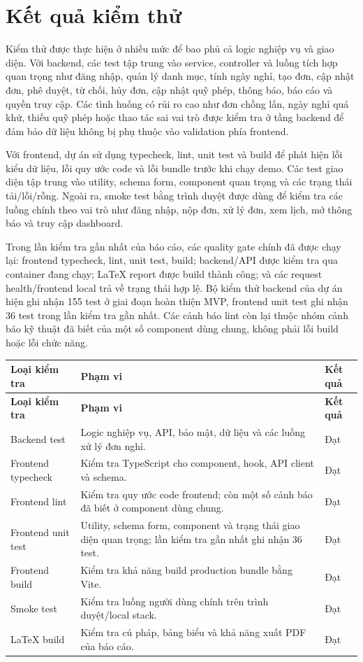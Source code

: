 \section{Kết quả kiểm thử}
Kiểm thử được thực hiện ở nhiều mức để bao phủ cả logic nghiệp vụ và giao diện. Với backend, các test tập trung vào service, controller và luồng tích hợp quan trọng như đăng nhập, quản lý danh mục, tính ngày nghỉ, tạo đơn, cập nhật đơn, phê duyệt, từ chối, hủy đơn, cập nhật quỹ phép, thông báo, báo cáo và quyền truy cập. Các tình huống có rủi ro cao như đơn chồng lấn, ngày nghỉ quá khứ, thiếu quỹ phép hoặc thao tác sai vai trò được kiểm tra ở tầng backend để đảm bảo dữ liệu không bị phụ thuộc vào validation phía frontend.

Với frontend, dự án sử dụng typecheck, lint, unit test và build để phát hiện lỗi kiểu dữ liệu, lỗi quy ước code và lỗi bundle trước khi chạy demo. Các test giao diện tập trung vào utility, schema form, component quan trọng và các trạng thái tải/lỗi/rỗng. Ngoài ra, smoke test bằng trình duyệt được dùng để kiểm tra các luồng chính theo vai trò như đăng nhập, nộp đơn, xử lý đơn, xem lịch, mở thông báo và truy cập dashboard.

Trong lần kiểm tra gần nhất của báo cáo, các quality gate chính đã được chạy lại: frontend typecheck, lint, unit test, build; backend/API được kiểm tra qua container đang chạy; LaTeX report được build thành công; và các request health/frontend local trả về trạng thái hợp lệ. Bộ kiểm thử backend của dự án hiện ghi nhận 155 test ở giai đoạn hoàn thiện MVP, frontend unit test ghi nhận 36 test trong lần kiểm tra gần nhất. Các cảnh báo lint còn lại thuộc nhóm cảnh báo kỹ thuật đã biết của một số component dùng chung, không phải lỗi build hoặc lỗi chức năng.

\begin{longtable}{p{}p{}p{}}
\toprule
\textbf{Loại kiểm tra} & \textbf{Phạm vi} & \textbf{Kết quả} \\
\midrule
\endfirsthead
\toprule
\textbf{Loại kiểm tra} & \textbf{Phạm vi} & \textbf{Kết quả} \\
\midrule
\endhead
Backend test & Logic nghiệp vụ, API, bảo mật, dữ liệu và các luồng xử lý đơn nghỉ. & Đạt \\
Frontend typecheck & Kiểm tra TypeScript cho component, hook, API client và schema. & Đạt \\
Frontend lint & Kiểm tra quy ước code frontend; còn một số cảnh báo đã biết ở component dùng chung. & Đạt \\
Frontend unit test & Utility, schema form, component và trạng thái giao diện quan trọng; lần kiểm tra gần nhất ghi nhận 36 test. & Đạt \\
Frontend build & Kiểm tra khả năng build production bundle bằng Vite. & Đạt \\
Smoke test & Kiểm tra luồng người dùng chính trên trình duyệt/local stack. & Đạt \\
LaTeX build & Kiểm tra cú pháp, bảng biểu và khả năng xuất PDF của báo cáo. & Đạt \\
\bottomrule
\end{longtable}

